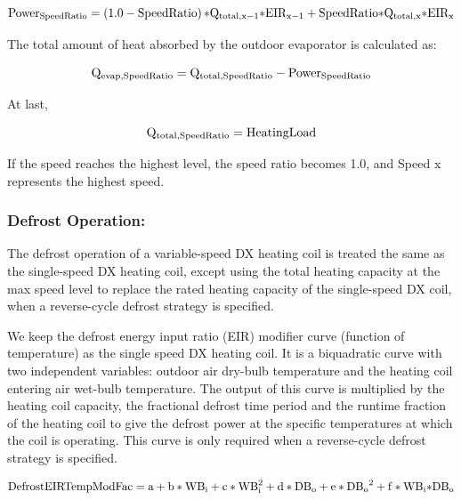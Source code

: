 \begin{equation}
{\rm{Powe}}{{\rm{r}}_{{\rm{SpeedRatio}}}} = \left( {1.0 - {\rm{SpeedRatio}}} \right){\rm{*}}{{\rm{Q}}_{{\rm{total}},{\rm{x}} - 1}}{\rm{*EI}}{{\rm{R}}_{{\rm{x}} - 1}} + {\rm{SpeedRatio*}}{{\rm{Q}}_{{\rm{total}},{\rm{x}}}}{\rm{*EI}}{{\rm{R}}_{\rm{x}}}
\end{equation}

The total amount of heat absorbed by the outdoor evaporator is calculated as:

\begin{equation}
{{\rm{Q}}_{{\rm{evap}},{\rm{SpeedRatio}}}} = {{\rm{Q}}_{{\rm{total}},{\rm{SpeedRatio}}}} - {\rm{Powe}}{{\rm{r}}_{{\rm{SpeedRatio}}}}
\end{equation}

At last,

\begin{equation}
{{\rm{Q}}_{{\rm{total}},{\rm{SpeedRatio}}}} = {\rm{HeatingLoad}}
\end{equation}

If the speed reaches the highest level, the speed ratio becomes 1.0, and Speed x represents the highest speed.

\subsubsection{Defrost Operation:}\label{defrost-operation-1}

The defrost operation of a variable-speed DX heating coil is treated the same as the single-speed DX heating coil, except using the total heating capacity at the max speed level to replace the rated heating capacity of the single-speed DX coil, when a reverse-cycle defrost strategy is specified.

We keep the defrost energy input ratio (EIR) modifier curve (function of temperature) as the single speed DX heating coil. It is a biquadratic curve with two independent variables: outdoor air dry-bulb temperature and the heating coil entering air wet-bulb temperature. The output of this curve is multiplied by the heating coil capacity, the fractional defrost time period and the runtime fraction of the heating coil to give the defrost power at the specific temperatures at which the coil is operating. This curve is only required when a reverse-cycle defrost strategy is specified.

\begin{equation}
{\rm{DefrostEIRTempModFac}} = {\rm{a}} + {\rm{b*W}}{{\rm{B}}_{\rm{i}}} + {\rm{c*WB}}_{\rm{i}}^2 + {\rm{d*D}}{{\rm{B}}_{\rm{o}}} + {\rm{e*D}}{{\rm{B}}_{\rm{o}}}^2 + {\rm{f*W}}{{\rm{B}}_{\rm{i}}}{\rm{*D}}{{\rm{B}}_{\rm{o}}}
\end{equation}

